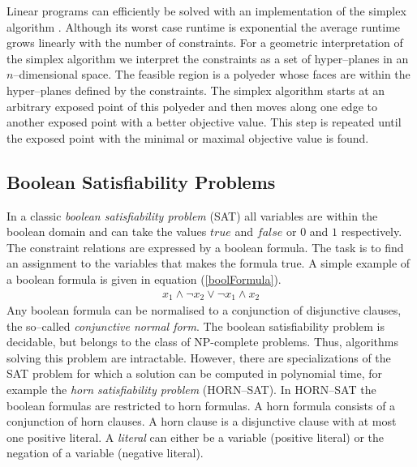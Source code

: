 Linear programs can efficiently be solved with an implementation of the simplex algorithm \cite{dantzig63Simplex}. Although its worst case runtime is exponential the average runtime grows linearly with the number of constraints. For a geometric interpretation of the simplex algorithm we interpret the constraints as a set of hyper--planes in an $n$--dimensional space. The feasible region is a polyeder whose faces are within the hyper--planes defined by the constraints. The simplex algorithm starts at an arbitrary exposed point of this polyeder and then moves along one edge to another exposed point with a better objective value. This step is repeated until the exposed point with the minimal or maximal objective value is found.
\subsection{Boolean Satisfiability Problems}
\label{sec:MathBooleanSat}
In a classic \emph{boolean satisfiability problem} (SAT) all variables are within the boolean domain and can take the values $true$ and $false$ or $0$ and $1$ respectively. The constraint relations are expressed by a boolean formula. The task is to find an assignment to the variables that makes the formula true. A simple example of a boolean formula is given in equation (\ref{boolFormula}).
\begin{eqnarray}
x_1 \land \neg x_2  \lor \neg x_1 \land {x_2}
\label{boolFormula}
\end{eqnarray}
Any boolean formula can be normalised to a conjunction of disjunctive clauses, the so--called \emph{conjunctive normal form}. The boolean satisfiability problem is decidable, but belongs to the class of NP-complete problems. Thus, algorithms solving this problem are intractable. However, there are specializations of the SAT problem for which a solution can be computed in polynomial time, for example the \emph{horn satisfiability problem} (HORN--SAT). In HORN--SAT the boolean formulas are restricted to horn formulas. A horn formula consists of a conjunction of horn clauses. A horn clause is a disjunctive clause with at most one positive literal. A \emph{literal} can either be a variable (positive literal) or the negation of a variable (negative literal).\\
